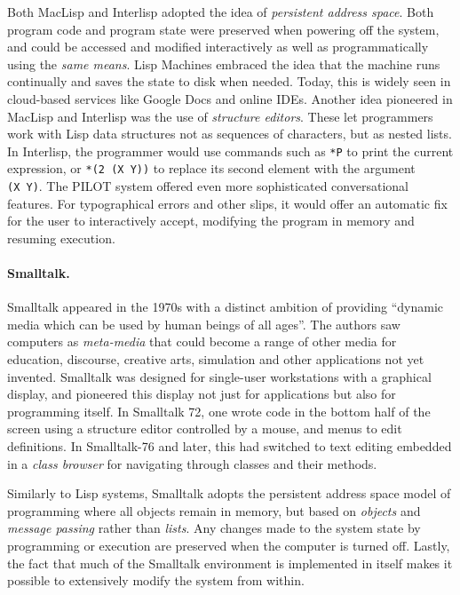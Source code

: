\documentclass[english,submission]{programming}
\providecommand{\DIFadd}[1]{{\protect\color{blue}\uwave{#1}}} %
\providecommand{\DIFaddbegin}{} %
\providecommand{\DIFaddend}{} %
\begin{document}
Both MacLisp and Interlisp adopted the idea of \emph{persistent address
space}. Both program code and program state were preserved when powering
off the system, and could be accessed and modified interactively as well
as programmatically using the \emph{same means}. Lisp Machines embraced
the idea that the machine runs continually and saves the state to disk
when needed. Today, this is widely seen in cloud-based services like
Google Docs and online IDEs. Another idea pioneered in MacLisp and
Interlisp was the use of \emph{structure editors}. These let programmers
work with Lisp data structures not as sequences of characters, but as
nested lists. In Interlisp, the programmer would use commands such as
\texttt{*P} to print the current expression, or \texttt{*(2\ (X\ Y))} to
replace its second element with the argument \texttt{(X\ Y)}. The PILOT
system\DIFaddbegin \DIFadd{~}\DIFaddend \cite{Pilot} offered even more sophisticated conversational
features. For typographical errors and other slips, it would offer an
automatic fix for the user to interactively accept, modifying the
program in memory and resuming execution.

\paragraph{Smalltalk.}

Smalltalk appeared in the 1970s with a distinct ambition of providing
``dynamic media which can be used by human beings of all
ages''\DIFaddbegin \DIFadd{~}\DIFaddend \cite{PersonalDynMedia}. The authors saw computers as
\emph{meta-media} that could become a range of other media for
education, discourse, creative arts, simulation and other applications
not yet invented. Smalltalk was designed for single-user workstations
with a graphical display, and pioneered this display not just for
applications but also for programming itself. In Smalltalk 72, one wrote
code in the bottom half of the screen using a structure editor
controlled by a mouse, and menus to edit definitions. In Smalltalk-76
and later, this had switched to text editing embedded in a \emph{class
browser} for navigating through classes and their methods.

Similarly to Lisp systems, Smalltalk adopts the persistent address space
model of programming where all objects remain in memory, but based on
\emph{objects} and \emph{message passing} rather than \emph{lists}. Any
changes made to the system state by programming or execution are
preserved when the computer is turned off. Lastly, the fact that much of
the Smalltalk environment is implemented in itself makes it possible to
extensively modify the system from within.
\end{document}
